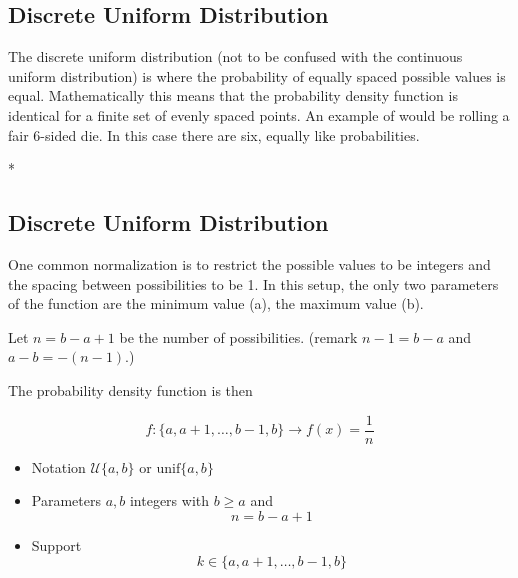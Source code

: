 

\Large 



\subsection*{Discrete Uniform Distribution}

The discrete uniform distribution (not to be confused with the continuous uniform distribution) is where the probability of equally spaced possible values is equal. Mathematically this means that the probability density function is identical for a finite set of evenly spaced points. An example of would be rolling a fair 6-sided die. In this case there are six, equally like probabilities.

*
\subsection{Discrete Uniform Distribution}
One common normalization is to restrict the possible values to be integers and the spacing between possibilities to be 1. In this setup, the only two parameters of the function are the minimum value (a), the maximum value (b). 

\noindent Let $n=b-a+1$ be the number of possibilities. (remark $n-1 = b-a$ and $a-b = -(n-1)$.)


\noindent The probability density function is then

\[f\colon\{a,a+1,\ldots,b-1,b\} \rightarrow f\left(x\right)=\frac{1}{n}\]

\begin{framed}
\begin{itemize}
\item Notation	${\displaystyle {\mathcal {U}}\{a,b\}}$ or ${\mathrm  {unif}}\{a,b\}$
\item Parameters	${\displaystyle a,b}$ integers with ${\displaystyle b\geq a}$ and 
\[{\displaystyle n=b-a+1}\]
\item Support	\[{\displaystyle k\in \{a,a+1,\dots ,b-1,b\}}\]
\end{itemize}
\end{framed}

